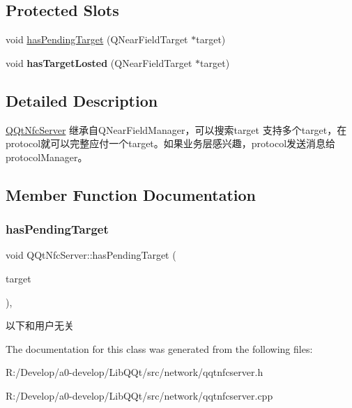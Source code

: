 \subsection*{Protected Slots}
\begin{DoxyCompactItemize}
\item 
void \mbox{\hyperlink{class_q_qt_nfc_server_a6c3d4172a05c35de8bbd2626e2672acd}{has\+Pending\+Target}} (Q\+Near\+Field\+Target $\ast$target)
\item 
\mbox{\label{class_q_qt_nfc_server_a5d6579ef819131cce8feedc4cee498de}} 
void {\bfseries has\+Target\+Losted} (Q\+Near\+Field\+Target $\ast$target)
\end{DoxyCompactItemize}


\subsection{Detailed Description}
\mbox{\hyperlink{class_q_qt_nfc_server}{Q\+Qt\+Nfc\+Server}} 继承自\+Q\+Near\+Field\+Manager，可以搜索target 支持多个target，在protocol就可以完整应付一个target。如果业务层感兴趣，protocol发送消息给protocol\+Manager。 

\subsection{Member Function Documentation}
\mbox{\label{class_q_qt_nfc_server_a6c3d4172a05c35de8bbd2626e2672acd}} 
\subsubsection{\texorpdfstring{has\+Pending\+Target}{hasPendingTarget}}
{\footnotesize\ttfamily void Q\+Qt\+Nfc\+Server\+::has\+Pending\+Target (\begin{DoxyParamCaption}\item[{Q\+Near\+Field\+Target $\ast$}]{target }\end{DoxyParamCaption})\hspace{0.3cm}{\ttfamily [protected]}, {\ttfamily [slot]}}

以下和用户无关 

The documentation for this class was generated from the following files\+:\begin{DoxyCompactItemize}
\item 
R\+:/\+Develop/a0-\/develop/\+Lib\+Q\+Qt/src/network/qqtnfcserver.\+h\item 
R\+:/\+Develop/a0-\/develop/\+Lib\+Q\+Qt/src/network/qqtnfcserver.\+cpp\end{DoxyCompactItemize}
